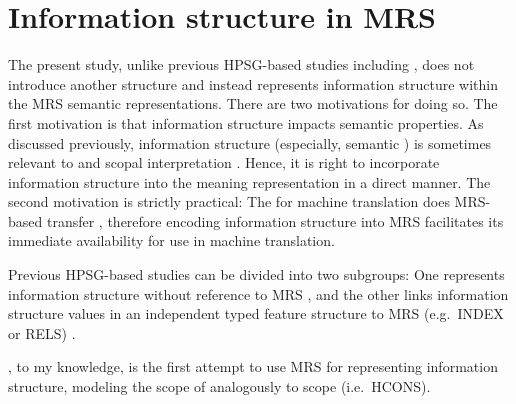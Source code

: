 \section{Information structure in MRS}
\label{8:sec:mrs}


The present study, unlike previous HPSG-based studies including
\citet{engdahl:vallduvi:96}, does not introduce another structure and
instead represents information structure within the MRS semantic
representations. There are two motivations for doing so. The
first motivation is that information structure impacts semantic
properties. As discussed previously, information structure
(especially, semantic ) is sometimes relevant to
 \citep{gundel:99} and scopal interpretation
\citep{buring:97,portner:yabushita:98,erteschik:99,erteschik:07,bianchi:frascarelli:10}.
Hence, it is right to incorporate information structure into the
meaning representation in a direct manner.  The second motivation is
strictly practical: The  for machine translation
does MRS-based transfer \citep{oepen:etal:07}, therefore encoding
information structure into MRS facilitates its immediate availability
for use in machine translation.



\largerpage[-1]
Previous HPSG-based studies can be divided into two subgroups: One
represents information structure without reference to MRS
\citep{dekuthy:00,chang:02,chung:etal:03,ohtani:matsumoto:04,webelhuth:07,kim:07,kim:12a},
and the other links information structure values in an independent
typed feature structure to MRS (e.g.\ INDEX or RELS)
\citep{wilcock:05,yoshimoto:etal:06,paggio:09,bildhauer:cook:10,sato:tam:12}.



\citet{wilcock:05}, to my knowledge, is the first attempt to use MRS
for representing information structure, modeling the scope of
 analogously to  scope
(i.e.\ HCONS).





